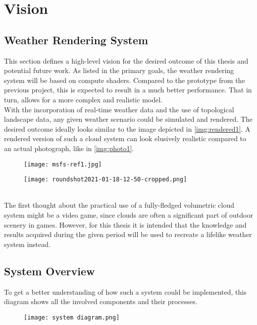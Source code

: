 \section{Vision}

\subsection{Weather Rendering System}
This section defines a high-level vision for the desired outcome of this thesis and potential future work.
As listed in the primary goals, the weather rendering system will be based on compute shaders.
Compared to the prototype from the previous project, this is expected to result in a much better performance.
That in turn, allows for a more complex and realistic model.
\\
With the incorporation of real-time weather data and the use of topological landscape data, any given weather scenario could be simulated and rendered.
The desired outcome ideally looks similar to the image depicted in \autoref{img:rendered1}.
A rendered version of such a cloud system can look elusively realistic compared to an actual photograph, like in \autoref{img:photo1}.
\begin{figure}[ht]
    \centering
        \begin{minipage}{0.47\linewidth}
            \texttt{[image: msfs-ref1.jpg]}
            \label{img:rendered1}
        \end{minipage}
    \hfill
        \begin{minipage}{0.47\linewidth}
            \texttt{[image: roundshot2021-01-18-12-50-cropped.png]}
            \label{img:photo1}        
        \end{minipage}  
\end{figure}
\\
The first thought about the practical use of a fully-fledged volumetric cloud system might be a video game, since clouds are often a significant part of outdoor scenery in games.
However, for this thesis it is intended that the knowledge and results acquired during the given period will be used to recreate a lifelike weather system instead.

\clearpage

\subsection{System Overview}
To get a better understanding of how such a system could be implemented, this diagram shows all the involved components and their processes.
\begin{figure}[H]
    \centering
    \texttt{[image: system diagram.png]}
    \label{img:systemoverview}
\end{figure}

